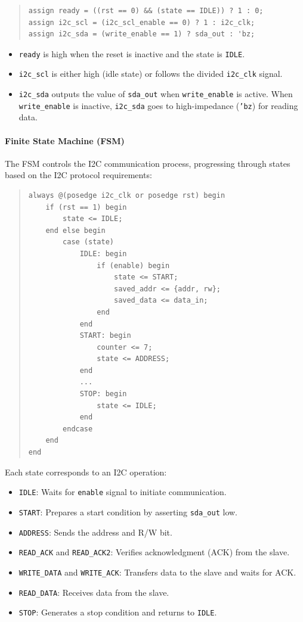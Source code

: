 \documentclass[a4paper,12pt]{report}
\begin{document}
\begin{quote}
\begin{verbatim}
assign ready = ((rst == 0) && (state == IDLE)) ? 1 : 0;
assign i2c_scl = (i2c_scl_enable == 0) ? 1 : i2c_clk;
assign i2c_sda = (write_enable == 1) ? sda_out : 'bz;
\end{verbatim}
\end{quote}

\begin{itemize}
    \item \texttt{ready} is high when the reset is inactive and the state is \texttt{IDLE}.
    \item \texttt{i2c\_scl} is either high (idle state) or follows the divided \texttt{i2c\_clk} signal.
    \item \texttt{i2c\_sda} outputs the value of \texttt{sda\_out} when \texttt{write\_enable} is active. When \texttt{write\_enable} is inactive, \texttt{i2c\_sda} goes to high-impedance (\texttt{'bz}) for reading data.
\end{itemize}

\paragraph{Finite State Machine (FSM)}
The FSM controls the I2C communication process, progressing through states based on the I2C protocol requirements:

\begin{quote}
\begin{verbatim}
always @(posedge i2c_clk or posedge rst) begin
    if (rst == 1) begin
        state <= IDLE;
    end else begin
        case (state)
            IDLE: begin
                if (enable) begin
                    state <= START;
                    saved_addr <= {addr, rw};
                    saved_data <= data_in;
                end
            end
            START: begin
                counter <= 7;
                state <= ADDRESS;
            end
            ...
            STOP: begin
                state <= IDLE;
            end
        endcase
    end
end
\end{verbatim}
\end{quote}

Each state corresponds to an I2C operation:
\begin{itemize}
    \item \texttt{IDLE}: Waits for \texttt{enable} signal to initiate communication.
    \item \texttt{START}: Prepares a start condition by asserting \texttt{sda\_out} low.
    \item \texttt{ADDRESS}: Sends the address and R/W bit.
    \item \texttt{READ\_ACK} and \texttt{READ\_ACK2}: Verifies acknowledgment (ACK) from the slave.
    \item \texttt{WRITE\_DATA} and \texttt{WRITE\_ACK}: Transfers data to the slave and waits for ACK.
    \item \texttt{READ\_DATA}: Receives data from the slave.
    \item \texttt{STOP}: Generates a stop condition and returns to \texttt{IDLE}.
\end{itemize}
\end{document}
